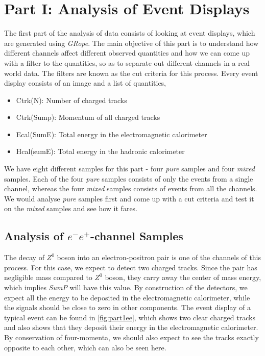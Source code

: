 \section{Part I: Analysis of Event Displays}
The first part of the analysis of data consists of looking at event displays, which are generated using \textit{GRope}. The main objective of this part is to understand how different channels affect different observed quantities and how we can come up with a filter to the quantities, so as to separate out different channels in a real world data. The filters are known as the cut criteria for this process. Every event display consists of an image and a list of quantities,
\begin{itemize}
    \item Ctrk(N): Number of charged tracks
    \item Ctrk(Sump): Momentum of all charged tracks
    \item Ecal(SumE): Total energy in the electromagnetic calorimeter
    \item Hcal(sumE): Total energy in the hadronic calorimeter
\end{itemize}
We have eight different samples for this part - four \textit{pure} samples and four \textit{mixed} samples. Each of the four \textit{pure} samples consists of only the events from a single channel, whereas the four \textit{mixed} samples consists of events from all the channels. We would analyse \textit{pure} samples first and come up with a cut criteria and test it on the \textit{mixed} samples and see how it fares.

\subsection{Analysis of $e^-e^+$-channel Samples}
The decay of $Z^0$ boson into an electron-positron pair is one of the channels of this process. For this case, we expect to detect two charged tracks. Since the pair has negligible mass compared to $Z^0$ boson, they carry away the center of mass energy, which implies \textit{SumP} will have this value. By construction of the detectors, we expect all the energy to be deposited in the electromagnetic calorimeter, while the signals should be close to zero in other components. The event display of a typical event can be found in \ref{fig:part1ee}, which shows two clear charged tracks and also shows that they deposit their energy in the electromagnetic calorimeter. By conservation of four-momenta, we should also expect to see the tracks exactly opposite to each other, which can also be seen here.


